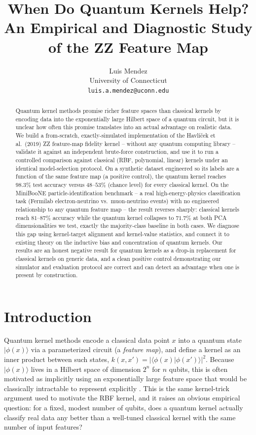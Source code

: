 \documentclass{article}
\title{When Do Quantum Kernels Help? \\ An Empirical and Diagnostic Study of the ZZ Feature Map}
\author{
  Luis Mendez \\
  University of Connecticut \\
  \texttt{luis.a.mendez@uconn.edu}
}
\begin{document}
\raggedbottom

\maketitle

\begin{abstract}
Quantum kernel methods promise richer feature spaces than classical kernels by
encoding data into the exponentially large Hilbert space of a quantum circuit,
but it is unclear how often this promise translates into an actual advantage
on realistic data. We build a from-scratch, exactly-simulated implementation
of the Havl{\'i}\v{c}ek et al.\ (2019) ZZ feature-map fidelity kernel --
without any quantum computing library -- validate it against an independent
brute-force construction, and use it to run a controlled comparison against
classical (RBF, polynomial, linear) kernels under an identical model-selection
protocol. On a synthetic dataset engineered so its labels are a function of
the same feature map (a positive control), the quantum kernel reaches
$98.3\%$ test accuracy versus $48$--$53\%$ (chance level) for every classical
kernel. On the MiniBooNE particle-identification benchmark -- a real
high-energy-physics classification task (Fermilab electron-neutrino vs.\
muon-neutrino events) with no engineered relationship to any quantum feature
map -- the result reverses sharply: classical kernels reach $81$--$87\%$
accuracy while the quantum kernel collapses to $71.7\%$ at both PCA
dimensionalities we test, exactly the majority-class baseline in both cases.
We diagnose this
gap using kernel-target alignment and kernel-value statistics, and connect it
to existing theory on the inductive bias and concentration of quantum
kernels. Our results are an honest negative result for quantum kernels as a
drop-in replacement for classical kernels on generic data, and a clean
positive control demonstrating our simulator and evaluation protocol are
correct and can detect an advantage when one is present by construction.
\end{abstract}

\section{Introduction}

Quantum kernel methods encode a classical data point $x$ into a quantum state
$|\phi(x)\rangle$ via a parameterized circuit (a \emph{feature map}), and
define a kernel as an inner product between such states, $k(x,x') =
|\langle\phi(x)|\phi(x')\rangle|^2$. Because $|\phi(x)\rangle$ lives in a
Hilbert space of dimension $2^n$ for $n$ qubits, this is often motivated as
implicitly using an exponentially large feature space that would be
classically intractable to represent explicitly
\citep{rebentrost2014quantum, schuld2019quantum, havlicek2019supervised}.
This is the same kernel-trick argument used to motivate the RBF kernel, and
it raises an obvious empirical question: for a fixed, modest number of
qubits, does a quantum kernel actually classify real data any better than a
well-tuned classical kernel with the same number of input features?
\end{document}

